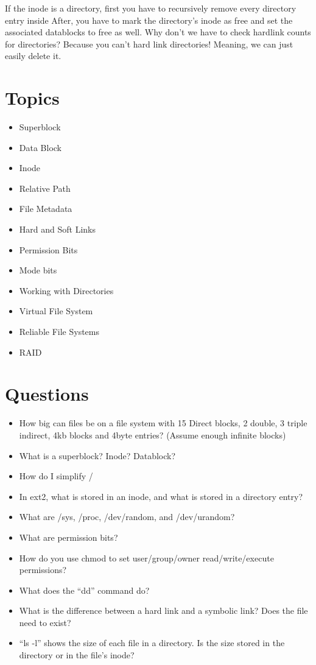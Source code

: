 If the inode is a directory, first you have to recursively remove every directory entry inside
After, you have to mark the directory's inode as free and set the associated datablocks to free as well.
Why don't we have to check hardlink counts for directories?
Because you can't hard link directories! Meaning, we can just easily delete it.

\section{Topics}

\begin{itemize}
\tightlist
\item
  Superblock
\item
  Data Block
\item
  Inode
\item
  Relative Path
\item
  File Metadata
\item
  Hard and Soft Links
\item
  Permission Bits
\item
  Mode bits
\item
  Working with Directories
\item
  Virtual File System
\item
  Reliable File Systems
\item
  RAID
\end{itemize}

\section{Questions}

\begin{itemize}
\tightlist
\item
  How big can files be on a file system with 15 Direct blocks, 2 double, 3 triple indirect, 4kb blocks and 4byte entries? (Assume enough infinite blocks)
\item
  What is a superblock? Inode? Datablock?
\item
  How do I simplify /
\item
  In ext2, what is stored in an inode, and what is stored in a directory entry?
\item
  What are /sys, /proc, /dev/random, and /dev/urandom?
\item
  What are permission bits?
\item
  How do you use chmod to set user/group/owner read/write/execute permissions?
\item
  What does the ``dd'' command do?
\item
  What is the difference between a hard link and a symbolic link? Does the file need to exist?
\item
  ``ls -l'' shows the size of each file in a directory. Is the size stored in the directory or in the file's inode?
\end{itemize}



